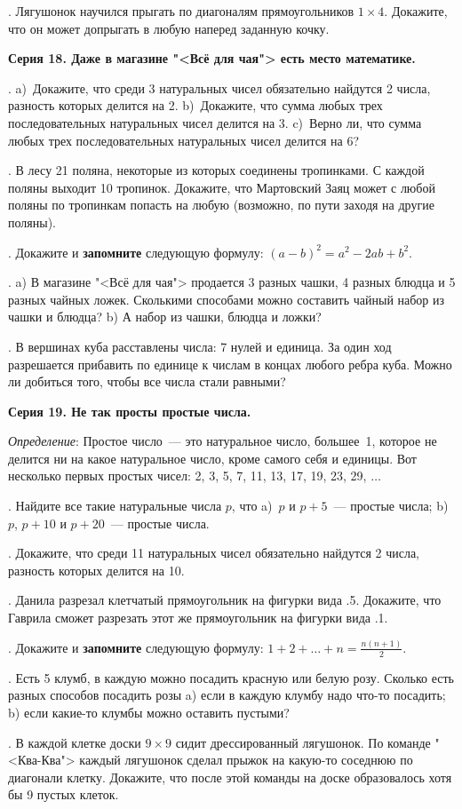 . Лягушонок научился прыгать по диагоналям прямоугольников $1\times 4$. 
Докажите, что он может допрыгать в любую наперед заданную кочку.

\centerline{\bf Серия 18. Даже в магазине "<Всё для чая"> есть место математике.}

. a)~Докажите, что среди 3 натуральных чисел обязательно найдутся 2
числа, разность которых делится на 2.
b)~Докажите, что сумма любых трех последовательных натуральных
чисел делится на 3. c)~Верно ли, что сумма любых трех последовательных натуральных
чисел делится на 6?

. В лесу 21 поляна, некоторые из которых соединены тропинками.
С каждой поляны выходит 10  тропинок. Докажите, что Мартовский Заяц может
с любой поляны по тропинкам попасть на любую (возможно, по пути заходя
на другие поляны).

.  Докажите и {\bf запомните} следующую формулу: $(a-b)^2=a^2-2ab+b^2$.

.  a) В магазине "<Всё для чая"> продается 3 разных чашки, 4 разных блюдца и
5 разных чайных ложек. Сколькими способами можно составить чайный набор из
чашки и блюдца?
b) А набор из чашки, блюдца и ложки?

.  В вершинах куба расставлены числа: 7 нулей и единица. За один ход разрешается прибавить 
по единице к числам в концах любого ребра куба. Можно ли добиться того, чтобы все числа  стали равными? 

\centerline{\bf Серия 19. Не так просты простые числа.}

\noindent \textit {Определение}: Простое число~--- это натуральное число, 
большее~1, которое не делится ни на какое натуральное число,
кроме самого себя и единицы. Вот несколько
первых простых чисел: 2, 3, 5, 7, 11, 13, 17, 19, 23, 29, $\ldots$

\smallskip

. Найдите все такие натуральные числа $p$, что 
a)~$p$ и $p+5$~--- простые числа;
b)~$p$, $p+10$ и $p+20$~--- простые числа.

. Докажите, что среди 11 натуральных чисел обязательно найдутся 2
числа, разность которых делится на 10.


.  Данила разрезал клетчатый прямоугольник на фигурки вида 
\lower.5\cellsize\cells{
 _
|_|_ 
|_|_|
}. 
Докажите, что Гаврила сможет разрезать этот же прямоугольник на фигурки вида
\lower.1\cellsize\cells{
 _ _ _ 
|_|_|_|
}.

.  Докажите и {\bf запомните} следующую формулу: $1+2+\ldots+n=\frac{n(n+1)}{2}$. 

.  Есть 5 клумб, в каждую можно посадить красную или белую розу.
Сколько есть разных способов посадить розы
a) если в каждую клумбу надо что-то посадить;
b) если какие-то клумбы можно оставить пустыми?

.  В каждой клетке доски $9\times 9$ сидит дрессированный лягушонок. 
По команде "<Ква-Ква"> каждый лягушонок сделал прыжок на какую-то соседнюю по диагонали клетку. 
Докажите, что после этой команды на доске образовалось хотя бы 9 пустых клеток.